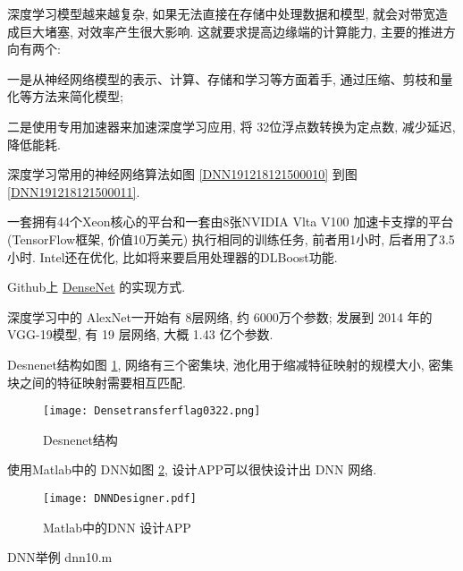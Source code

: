 深度学习模型越来越复杂, 如果无法直接在存储中处理数据和模型, 就会对带宽造成巨大堵塞, 对效率产生很大影响.
这就要求提高边缘端的计算能力, 主要的推进方向有两个:

一是从神经网络模型的表示、计算、存储和学习等方面着手, 通过压缩、剪枝和量化等方法来简化模型;

二是使用专用加速器来加速深度学习应用, 将 32位浮点数转换为定点数, 减少延迟, 降低能耗.

深度学习常用的神经网络算法如图  \ref{DNN191218121500010} 到图  \ref{DNN191218121500011}.
\begin{exampleT}
    一套拥有44个Xeon核心的平台和一套由8张NVIDIA Vlta V100 加速卡支撑的平台 (TensorFlow框架,
    价值10万美元) 执行相同的训练任务, 前者用1小时, 后者用了3.5小时.
Intel还在优化, 比如将来要启用处理器的DLBoost功能.
\end{exampleT}
\begin{exampleT}
    Github上 \href{https://github.com/zggl/DenseNet}{DenseNet} 的实现方式.
\end{exampleT}
\begin{example}
    深度学习中的 AlexNet一开始有 8层网络, 约 6000万个参数;
    发展到 2014 年的 VGG-19模型, 有 19 层网络, 大概 1.43 亿个参数.
\end{example}

Desnenet结构如图 \ref{Densetransferflag03220304}, 网络有三个密集块,
池化用于缩减特征映射的规模大小, 密集块之间的特征映射需要相互匹配.
\begin{figure}[H]
    \centering
    \texttt{[image: Densetransferflag0322.png]}
    \caption{Desnenet结构}
    \label{Densetransferflag03220304}
\end{figure}

使用Matlab中的 DNN如图 \ref{DNNDesigner20200304}, 设计APP可以很快设计出 DNN 网络.
\begin{figure}[H]
    \centering
    \texttt{[image: DNNDesigner.pdf]}
    \caption{Matlab中的DNN 设计APP}
    \label{DNNDesigner20200304}
\end{figure}

DNN举例 dnn10.m
